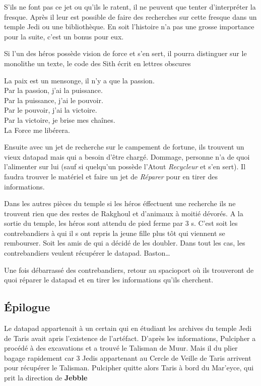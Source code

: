 S'ils ne font pas ce jet ou qu'ils le ratent, il ne peuvent que tenter d'interpréter la fresque. Après il leur est possible de faire des recherches sur cette fresque dans un temple Jedi ou une bibliothèque. En soit l'histoire n'a pas une grosse importance pour la suite, c'est un bonus pour eux.

Si l'un des héros possède vision de force et s'en sert, il pourra distinguer sur le monolithe un texte, le code des Sith écrit en lettres obscures
\begin{quotebox}
La paix est un mensonge, il n’y a que la passion. \\
Par la passion, j’ai la puissance. \\
Par la puissance, j’ai le pouvoir. \\
Par le pouvoir, j’ai la victoire. \\
Par la victoire, je brise mes chaînes. \\
La Force me libérera.
\end{quotebox}

Ensuite avec un jet de recherche sur le campement de fortune, ils trouvent un vieux datapad mais qui a besoin d'être chargé. Dommage, personne n'a de quoi l'alimenter sur lui (sauf si quelqu'un possède l'Atout \emph{Recycleur} et s'en sert). Il faudra trouver le matériel et faire un jet de \emph{Réparer} pour en tirer des informations.

Dans les autres pièces du temple si les héros éffectuent une recherche ils ne trouvent rien que des restes de Rakghoul et d'animaux à moitié dévorés.
A la sortie du temple, les héros sont attendu de pied ferme par 3 s. C'est soit les contrebandiers à qui il s ont repris la jeune fille plus tôt qui viennent se rembourser. Soit les amis de  qui a décidé de les doubler. Dans tout les cas, les contrebandiers veulent récupérer le datapad. Baston\ldots

Une fois débarrassé des contrebandiers, retour au spacioport où ils trouveront de quoi réparer le datapad et en tirer les informations qu'ils cherchent.

\subsection{\'Epilogue}
Le datapad appartenait à un certain  qui en étudiant les archives du temple Jedi de Taris avait apris l'existence de l'artéfact. D'après les informations, Pulcipher a procédé à des excavations et a trouvé le Talisman de Muur. Mais il du plier bagage rapidement car 3 Jedis appartenant au Cercle de Veille de Taris arrivent pour récupérer le Talisman. Pulcipher quitte alors Taris à bord du Mar'eyce, qui prit la direction de \textbf{Jebble}

